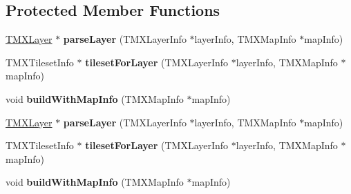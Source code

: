 \subsection*{Protected Member Functions}
\begin{DoxyCompactItemize}
\item 
\mbox{\label{classTMXTiledMap_ab5d014ac35d3cc10d57e1360527cce27}} 
\hyperlink{classTMXLayer}{T\+M\+X\+Layer} $\ast$ {\bfseries parse\+Layer} (T\+M\+X\+Layer\+Info $\ast$layer\+Info, T\+M\+X\+Map\+Info $\ast$map\+Info)
\item 
\mbox{\label{classTMXTiledMap_a73930cb47843cada3c229e1f9e203f71}} 
T\+M\+X\+Tileset\+Info $\ast$ {\bfseries tileset\+For\+Layer} (T\+M\+X\+Layer\+Info $\ast$layer\+Info, T\+M\+X\+Map\+Info $\ast$map\+Info)
\item 
\mbox{\label{classTMXTiledMap_a23841a41fe9bd8ac83780b22504185e5}} 
void {\bfseries build\+With\+Map\+Info} (T\+M\+X\+Map\+Info $\ast$map\+Info)
\item 
\mbox{\label{classTMXTiledMap_a776526cb04c1300d81593ccc5b35145b}} 
\hyperlink{classTMXLayer}{T\+M\+X\+Layer} $\ast$ {\bfseries parse\+Layer} (T\+M\+X\+Layer\+Info $\ast$layer\+Info, T\+M\+X\+Map\+Info $\ast$map\+Info)
\item 
\mbox{\label{classTMXTiledMap_a1f12e2f71851c40931fa349fe902e36b}} 
T\+M\+X\+Tileset\+Info $\ast$ {\bfseries tileset\+For\+Layer} (T\+M\+X\+Layer\+Info $\ast$layer\+Info, T\+M\+X\+Map\+Info $\ast$map\+Info)
\item 
\mbox{\label{classTMXTiledMap_a23841a41fe9bd8ac83780b22504185e5}} 
void {\bfseries build\+With\+Map\+Info} (T\+M\+X\+Map\+Info $\ast$map\+Info)
\end{DoxyCompactItemize}
